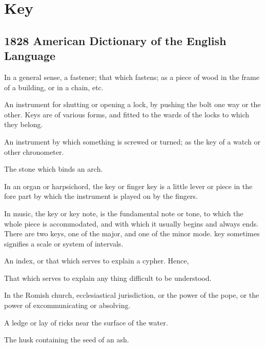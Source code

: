 \section{Key}
	\label{KEY}
	

\subsection{1828 American Dictionary of the English Language} %
	\label{KEY-1828}

	\begin{compactitem}
		\item In a general sense, a fastener; that which fastens; as a piece of wood in the frame of a building, or in a chain, etc.
		\item[1] An instrument for shutting or opening a lock, by pushing the bolt one way or the other. Keys are of various forms, and fitted to the wards of the locks to which they belong.
		\item[2] An instrument by which something is screwed or turned; as the key of a watch or other chronometer.
		\item[3] The stone which binds an arch.
		\item[4] In an organ or harpsichord, the key or finger key is a little lever or piece in the fore part by which the instrument is played on by the fingers.
		\item[5] In music, the key or key note, is the fundamental note or tone, to which the whole piece is accommodated, and with which it usually begins and always ends. There are two keys, one of the major, and one of the minor mode. key sometimes signifies a scale or system of intervals.
		\item[6] An index, or that which serves to explain a cypher. Hence,
		\item[7] That which serves to explain any thing difficult to be understood.
		\item[8] In the Romish church, ecclesiastical jurisdiction, or the power of the pope, or the power of excommunicating or absolving.
		\item[9] A ledge or lay of ricks near the surface of the water.
		\item[10] The husk containing the seed of an ash.
	\end{compactitem}

